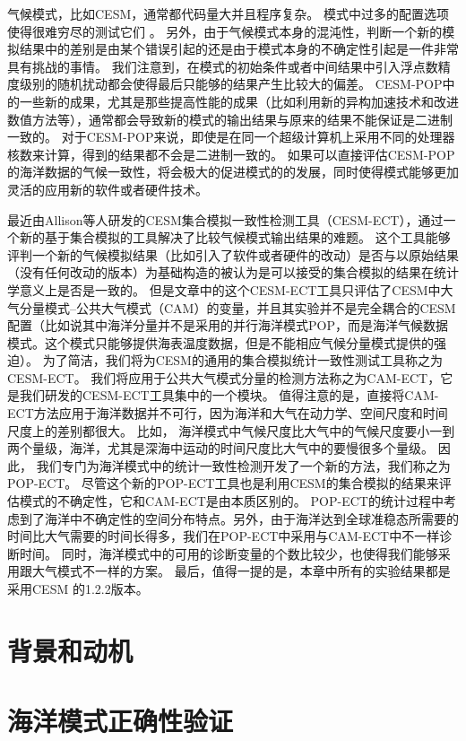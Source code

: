   
气候模式，比如CESM，通常都代码量大并且程序复杂。 模式中过多的配置选项使得很难穷尽的测试它们 \cite{clune2011, pipitone2012}。 
另外，由于气候模式本身的混沌性，判断一个新的模拟结果中的差别是由某个错误引起的还是由于模式本身的不确定性引起是一件非常具有挑战的事情。 
我们注意到，在模式的初始条件或者中间结果中引入浮点数精度级别的随机扰动都会使得最后只能够的结果产生比较大的偏差。
CESM-POP中的一些新的成果，尤其是那些提高性能的成果（比如利用新的异构加速技术和改进数值方法等），通常都会导致新的模式的输出结果与原来的结果不能保证是二进制一致的。 
对于CESM-POP来说，即使是在同一个超级计算机上采用不同的处理器核数来计算，得到的结果都不会是二进制一致的。 
如果可以直接评估CESM-POP的海洋数据的气候一致性，将会极大的促进模式的的发展，同时使得模式能够更加灵活的应用新的软件或者硬件技术。 


最近由Allison等人\cite{baker2015}研发的CESM集合模拟一致性检测工具（CESM-ECT），通过一个新的基于集合模拟的工具解决了比较气候模式输出结果的难题。 
这个工具能够评判一个新的气候模拟结果（比如引入了软件或者硬件的改动）是否与以原始结果（没有任何改动的版本）为基础构造的被认为是可以接受的集合模拟的结果在统计学意义上是否是一致的。 
但是文章\cite{baker2015}中的这个CESM-ECT工具只评估了CESM中大气分量模式--公共大气模式（CAM）的变量，并且其实验并不是完全耦合的CESM配置（比如说其中海洋分量并不是采用的并行海洋模式POP，而是海洋气候数据模式。这个模式只能够提供海表温度数据，但是不能相应气候分量模式提供的强迫）。 
为了简洁，我们将为CESM的通用的集合模拟统计一致性测试工具称之为CESM-ECT。 
我们将应用于公共大气模式分量的检测方法称之为CAM-ECT，它是我们研发的CESM-ECT工具集中的一个模块。 
值得注意的是，直接将CAM-ECT方法应用于海洋数据并不可行，因为海洋和大气在动力学、空间尺度和时间尺度上的差别都很大。
比如， 海洋模式中气候尺度比大气中的气候尺度要小一到两个量级，海洋，尤其是深海中运动的时间尺度比大气中的要慢很多个量级。
因此， 我们专门为海洋模式中的统计一致性检测开发了一个新的方法，我们称之为POP-ECT。 
尽管这个新的POP-ECT工具也是利用CESM的集合模拟的结果来评估模式的不确定性，它和CAM-ECT是由本质区别的。 
POP-ECT的统计过程中考虑到了海洋中不确定性的空间分布特点。另外，由于海洋达到全球准稳态所需要的时间比大气需要的时间长得多，我们在POP-ECT中采用与CAM-ECT中不一样诊断时间。 
同时，海洋模式中的可用的诊断变量的个数比较少，也使得我们能够采用跟大气模式不一样的方案。 
最后，值得一提的是，本章中所有的实验结果都是采用CESM 的1.2.2版本。
\section{背景和动机}
\label{verify:Backgroud}

\section{海洋模式正确性验证}
\label{verify:ocean}
